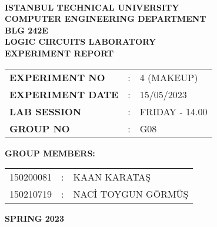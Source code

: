 \documentclass[pdftex,12pt,a4paper]{article}
\begin{document}
\begin{titlepage}
\begin{center}
\textbf{}\\
\textbf{\Large{ISTANBUL TECHNICAL UNIVERSITY}}\\
\vspace{0.5cm}
\textbf{\Large{COMPUTER ENGINEERING DEPARTMENT}}\\
\vspace{2cm}
\textbf{\Large{BLG 242E}}\\
\vspace{0.2cm}
\textbf{\Large{LOGIC CIRCUITS LABORATORY}}\\
\vspace{0.2cm}
\textbf{\Large{EXPERIMENT REPORT}}\\
\vspace{2cm}
\begin{table}[ht]
\centering
\Large{
\begin{tabular}{lcl}
\textbf{EXPERIMENT NO}  & : & 4 (MAKEUP) \\
\textbf{EXPERIMENT DATE}  & : & 15/05/2023 \\
\textbf{LAB SESSION}  & : & FRIDAY - 14.00 \\
\textbf{GROUP NO}  & : & G08 \\
\end{tabular}}\end{table}\vspace{1cm}
\textbf{\Large{GROUP MEMBERS:}}\\
\begin{table}[ht]\centering\Large{
\begin{tabular}{rcl}
150200081  & : & KAAN KARATAŞ \\
150210719  & : & NACİ TOYGUN GÖRMÜŞ \\
\end{tabular}}
\end{table}
\vspace{2.8cm}
\textbf{\Large{SPRING 2023}}
\end{center}
\end{titlepage}
\end{document}
